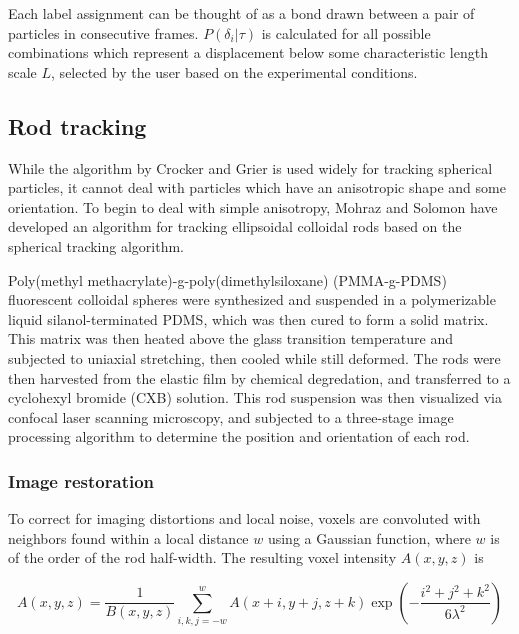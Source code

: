 Each label assignment can be thought of as a bond drawn between a pair of particles
in consecutive frames.  $P({\delta_i}|\tau)$ is calculated for all possible combinations which
represent a displacement below some characteristic length scale $L$, selected by the user based on
the experimental conditions.

\subsection{Rod tracking}

While the algorithm by Crocker and Grier is used widely for tracking spherical particles, it 
cannot deal with particles which have an anisotropic shape and some orientation. 
To begin to deal with simple anisotropy, Mohraz and Solomon have developed an algorithm for tracking 
ellipsoidal colloidal rods based on the spherical tracking algorithm.~\cite{rods-mohraz, solomon-dynamics}


Poly(methyl methacrylate)-g-poly(dimethylsiloxane) (PMMA-g-PDMS) fluorescent colloidal spheres were
synthesized and suspended in a polymerizable liquid silanol-terminated PDMS, which was then cured to form a solid 
matrix.  This matrix was then heated above the glass transition temperature and subjected to 
uniaxial stretching, then cooled while still deformed.  The rods were then harvested from the 
elastic film by chemical degredation, and transferred to a cyclohexyl bromide (CXB) solution.
This rod suspension was then visualized via confocal laser scanning microscopy, and 
subjected to a three-stage image processing algorithm to determine the position and orientation of each rod.

\subsubsection{Image restoration}

To correct for imaging distortions and local noise, voxels are convoluted with neighbors found within a local
distance $w$ using a Gaussian function, where $w$ is of the order of the rod half-width. The resulting
voxel intensity $A(x,y,z)$ is

\begin{center}
\begin{equation}
A(x,y,z) = \frac{1}{B(x,y,z)} \sum_{i,k,j=-w}^w A(x+i,y+j,z+k) 
\exp{ \left( -\frac{i^2+j^2+k^2}{6\lambda^2} \right)}
\end{equation}
\end{center}


